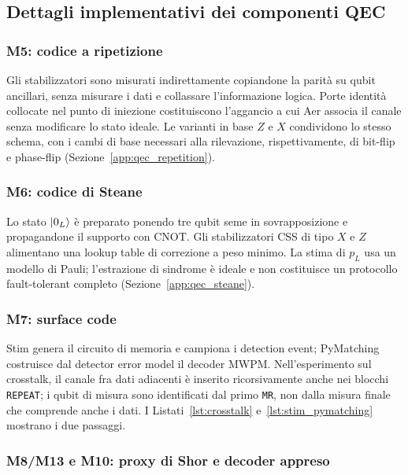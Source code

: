 \begin{onehalfspace}
\subsection{Dettagli implementativi dei componenti QEC}
\label{app:dettagli_qec}

\subsubsection{M5: codice a ripetizione}

Gli stabilizzatori sono misurati indirettamente copiandone la parità su qubit ancillari,
senza misurare i dati e collassare l'informazione logica. Porte identità collocate nel
punto di iniezione costituiscono l'aggancio a cui Aer associa il canale senza modificare
lo stato ideale. Le varianti in base $Z$ e $X$ condividono lo stesso schema, con i cambi
di base necessari alla rilevazione, rispettivamente, di bit-flip e phase-flip
(Sezione~\ref{app:qec_repetition}).

\subsubsection{M6: codice di Steane}

Lo stato $\ket{0_L}$ è preparato ponendo tre qubit seme in sovrapposizione e
propagandone il supporto con CNOT. Gli stabilizzatori CSS di tipo $X$ e $Z$ alimentano
una lookup table di correzione a peso minimo. La stima di $p_L$ usa un modello di Pauli;
l'estrazione di sindrome è ideale e non costituisce un protocollo fault-tolerant
completo (Sezione~\ref{app:qec_steane}).

\subsubsection{M7: surface code}

Stim genera il circuito di memoria e campiona i detection event; PyMatching costruisce
dal detector error model il decoder \ac{MWPM}. Nell'esperimento sul crosstalk, il canale
fra dati adiacenti è inserito ricorsivamente anche nei blocchi \texttt{REPEAT}; i qubit
di misura sono identificati dal primo \texttt{MR}, non dalla misura finale che comprende
anche i dati. I Listati~\ref{lst:crosstalk} e~\ref{lst:stim_pymatching} mostrano i due
passaggi.

\subsubsection{M8/M13 e M10: proxy di Shor e decoder appreso}


\end{onehalfspace}
